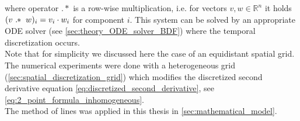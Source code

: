 \documentclass{scrartcl}[12pt, halfparskip]
\numberwithin{equation}{section}
\numberwithin{figure}{section}
\numberwithin{table}{section}
\begin{document}
where operator $.*$ is a row-wise multiplication, i.e. for vectors $v, w \in \mathbb{R}^n$ it holds $(v \ . \hspace{-0.1cm} * \ w)_i = v_i \cdot w_i$ for component $i$. This system can be solved by an appropriate ODE solver (see \cref{sec:theory_ODE_solver_BDF}) where the temporal discretization occurs. \\
Note that for simplicity we discussed here the case of an equidistant spatial grid. The numerical experiments were done with a heterogeneous grid (\cref{sec:spatial_discretization_grid}) which modifies the discretized second derivative equation \eqref{eq:discretized_second_derivative}, see \cref{eq:2_point_formula_inhomogeneous}. \\
The method of lines was applied in this thesis in \cref{sec:mathematical_model}.


%
%
%
%
%
%
%
%
%
%
%
\end{document}
